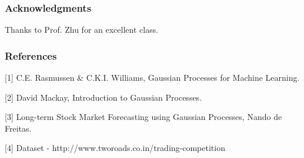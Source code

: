 \documentclass{article} %
\begin{document}
\subsubsection*{Acknowledgments}
Thanks to Prof. Zhu for an excellent class.

\subsubsection*{References}
\small{
	[1] C.E. Rasmussen \& C.K.I. Williams, Gaussian Processes for Machine Learning.

	[2] David Mackay, Introduction to Gaussian Processes.

 [3] Long-term Stock Market Forecasting using Gaussian Processes, Nando de Freitas.

 [4] Dataset - http://www.tworoads.co.in/trading-competition
 }
\end{document}

